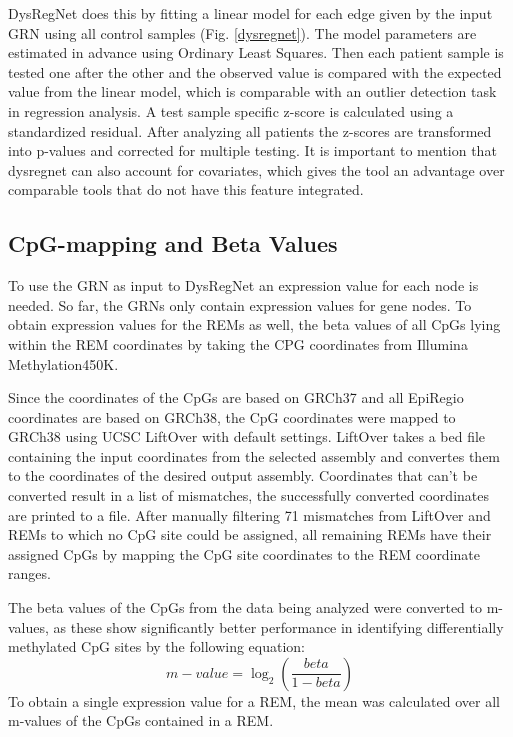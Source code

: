 \documentclass[pdftex,12pt,a4paper]{report}
\begin{document}
DysRegNet does this by fitting a linear model for each edge given by the input GRN using all control samples (Fig. \ref{dysregnet}). The model parameters are estimated in advance using Ordinary Least Squares. Then each patient sample is tested one after the other and the observed value is compared with the expected value from the linear model, which is comparable with an outlier detection task in regression analysis. A test sample specific z-score is calculated using a standardized residual. After analyzing all patients the z-scores are transformed into p-values and corrected for multiple testing. It is important to mention that dysregnet can also account for covariates, which gives the tool an advantage over comparable tools that do not have this feature integrated.

\subsection{CpG-mapping and Beta Values}
\label{beta values}
To use the GRN as input to DysRegNet an expression value for each node is needed. So far, the GRNs only contain expression values for gene nodes. To obtain expression values for the REMs as well, the beta values of all CpGs lying within the REM coordinates  by taking the CPG coordinates from Illumina Methylation450K\cite{methylation450}. 

Since the coordinates of the CpGs are based on GRCh37 and all EpiRegio coordinates are based on GRCh38, the CpG coordinates were mapped to GRCh38 using UCSC LiftOver with default settings\cite{liftover}. LiftOver takes a bed file containing the input coordinates from the selected assembly and convertes them to the coordinates of the desired output assembly. Coordinates that can't be converted result in a list of mismatches, the successfully converted coordinates are printed to a file. After manually filtering 71 mismatches from LiftOver and REMs to which no CpG site could be assigned, all remaining REMs have their assigned CpGs by mapping the CpG site coordinates to the REM coordinate ranges.

The beta values of the CpGs from the data being analyzed were converted to m-values, as these show significantly better performance in identifying differentially methylated CpG sites\cite{mvalues} by the following equation:
\begin{equation}
	m-value = \log_{2}{(\frac{beta}{1-beta})}
\end{equation}
To obtain a single expression value for a REM, the mean was calculated over all m-values of the CpGs contained in a REM.
\end{document}
